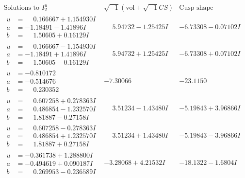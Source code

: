 \documentclass[1p]{elsarticle_modified}
\theoremstyle{definition}
\newcommand{\I}{\sqrt{-1}}
\begin{document}
$$\begin{array}{c|c|c}  
\text{Solutions to }I^u_{2}& \I (\text{vol} + \sqrt{-1}CS) & \text{Cusp shape}\\
 \hline 
\begin{aligned}
u &= \phantom{-}0.166667 + 1.154930 I \\
a &= -1.18491 - 1.41896 I \\
b &= \phantom{-}1.50605 + 0.16129 I\end{aligned}
 & \phantom{-}5.94732 - 1.25425 I & -6.73308 - 0.07102 I \\ \hline\begin{aligned}
u &= \phantom{-}0.166667 - 1.154930 I \\
a &= -1.18491 + 1.41896 I \\
b &= \phantom{-}1.50605 - 0.16129 I\end{aligned}
 & \phantom{-}5.94732 + 1.25425 I & -6.73308 + 0.07102 I \\ \hline\begin{aligned}
u &= -0.810172\phantom{ +0.000000I} \\
a &= -0.514676\phantom{ +0.000000I} \\
b &= \phantom{-}0.230352\phantom{ +0.000000I}\end{aligned}
 & -7.30066\phantom{ +0.000000I} & -23.1150\phantom{ +0.000000I} \\ \hline\begin{aligned}
u &= \phantom{-}0.607258 + 0.278363 I \\
a &= \phantom{-}0.486854 - 1.232570 I \\
b &= \phantom{-}1.81887 - 0.27158 I\end{aligned}
 & \phantom{-}3.51234 - 1.43480 I & -5.19843 + 3.96866 I \\ \hline\begin{aligned}
u &= \phantom{-}0.607258 - 0.278363 I \\
a &= \phantom{-}0.486854 + 1.232570 I \\
b &= \phantom{-}1.81887 + 0.27158 I\end{aligned}
 & \phantom{-}3.51234 + 1.43480 I & -5.19843 - 3.96866 I \\ \hline\begin{aligned}
u &= -0.361738 + 1.288800 I \\
a &= -0.494619 + 0.090187 I \\
b &= \phantom{-}0.269953 - 0.236589 I\end{aligned}
 & -3.28068 + 4.21532 I & -18.1322 - 1.6804 I \\ \hline\begin{aligned}

\end{aligned}
\end{array}$$
\end{document}
